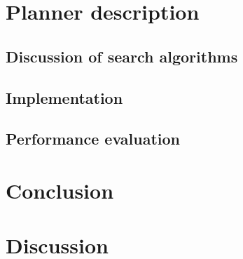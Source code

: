 \documentclass[draft, english, a4paper]{article}
\begin{document}
\section{Planner description}
    
	\subsection{Discussion of search algorithms} %
		
	\subsection{Implementation}
	
	\subsection{Performance evaluation}
	
\section{Conclusion}
\section{Discussion}


\appendix
\end{document}
